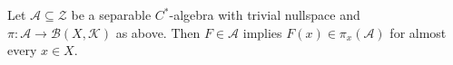 Let $\mathcal{A} \subseteq \mathcal{Z}$ be a separable $C^*$-algebra with trivial nullspace and $\pi: \mathcal{A} \to \mathcal{B}(X, \mathcal{K})$ as above. Then $F \in \mathcal{A}$ implies $F(x) \in \pi_x(\mathcal{A})$ for almost every $x \in X$.
